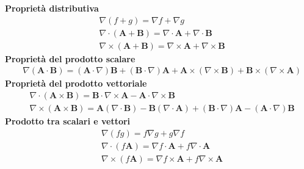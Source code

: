 \documentclass[10pt,a4paper]{book}
\begin{document}
\textbf{Proprietà distributiva}
\begin{align*}
	& \nabla (f+g) = \nabla f + \nabla g \\
	& \nabla \cdot ( \mathbf{A} + \mathbf{B} ) = \nabla \cdot \mathbf{A} + \nabla \cdot \mathbf{B} \\
	& \nabla \times ( \mathbf{A} + \mathbf{B} ) = \nabla \times \mathbf{A} + \nabla \times \mathbf{B}
\end{align*}
\textbf{Proprietà del prodotto scalare}
\begin{align*}
	&\nabla(\mathbf{A} \cdot \mathbf{B}) = (\mathbf{A} \cdot \nabla)\mathbf{B} + (\mathbf{B} \cdot \nabla)\mathbf{A} + \mathbf{A} \times (\nabla \times \mathbf{B}) + \mathbf{B} \times (\nabla \times \mathbf{A})
\end{align*}
\textbf{Proprietà del prodotto vettoriale}
\begin{align*}
	&\nabla \cdot (\mathbf{A} \times \mathbf{B}) = \mathbf{B} \cdot \nabla \times \mathbf{A} - \mathbf{A} \cdot \nabla \times \mathbf{B} \\
	&\nabla \times (\mathbf{A} \times \mathbf{B}) = \mathbf{A} (\nabla \cdot \mathbf{B}) -\mathbf{B}  (\nabla \cdot \mathbf{A})+( \mathbf{B}\cdot \nabla)\mathbf{A}-( \mathbf{A}\cdot \nabla)\mathbf{B}
\end{align*}
\textbf{Prodotto tra scalari e vettori}
\begin{align*}
	&\nabla (fg) = f \nabla g + g \nabla f \\
	&\nabla \cdot (f\mathbf{A}) = \nabla f \cdot \mathbf{A} + f \nabla \cdot \mathbf{A}\\
	&\nabla \times (f \mathbf{A}) = \nabla f \times \mathbf{A} + f \nabla \times \mathbf{A}
\end{align*}
\end{document}
